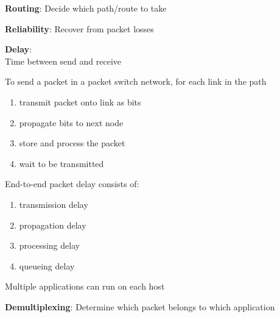 \begin{frame} \begin{center}\large
\textbf{Routing}: Decide which path/route to take
\end{center}\end{frame}

\begin{frame}\begin{center}\large
\textbf{Reliability}: Recover from packet losses
\end{center}\end{frame}

\begin{frame}\begin{center}\large
\textbf{Delay}:\\ Time between send and receive
\end{center}\end{frame}

\begin{frame}\normalsize
To send a packet in a packet switch network, for each link in the path
\begin{enumerate}
\item transmit packet onto link as bits
\item propagate bits to next node
\item store and process the packet
\item wait to be transmitted
\end{enumerate}
\end{frame}

\begin{frame}\normalsize
End-to-end packet delay consists of:
\begin{enumerate}
\item transmission delay
\item propagation delay
\item processing delay
\item queueing delay
\end{enumerate}
\end{frame}

\begin{frame}[t]
\end{frame}

\begin{frame}[t]\normalsize
	Multiple applications can run on each host
\end{frame}

\begin{frame}\begin{center}\large
\textbf{Demultiplexing}: Determine which packet belongs to which application
\end{center}\end{frame}

